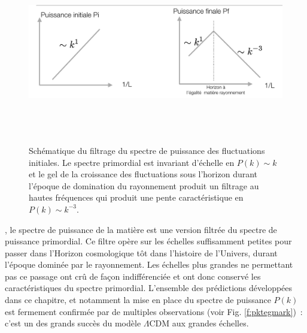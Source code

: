 \begin{figure}[htbp]
	\centering
		\includegraphics[height=8cm]{figs/pk.png}
		\caption[Schématique du filtrage du spectre de puissance des fluctuations initiales.]{Schématique du filtrage du spectre de puissance des fluctuations initiales. Le spectre primordial est invariant d'échelle en $P(k)\sim k$ et le gel de la croissance des fluctuations sous l'horizon durant l'époque de domination du rayonnement produit un filtrage au hautes fréquences qui produit une pente caractéristique en $P(k)\sim k^{-3}$.}
	\label{f:pk}
\end{figure}

, le spectre de puissance de la matière est une version filtrée du spectre de puissance primordial. Ce filtre opère sur les échelles suffisamment petites pour passer dans l'Horizon cosmologique tôt dans l'histoire de l'Univers, durant l'époque dominée par le rayonnement. Les échelles plus grandes ne permettant pas ce passage ont crû de façon indifférenciée et ont donc conservé les caractéristiques du spectre primordial. L'ensemble des prédictions développées dans ce chapitre, et notamment la mise en place du spectre de puissance $P(k)$ est fermement confirmée par de multiples observations (voir Fig. \ref{f:pktegmark})~: c'est un des grands succès du modèle $\Lambda$CDM aux grandes échelles.

